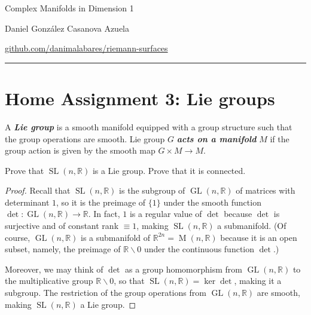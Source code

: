 \documentclass{article}
\numberwithin{equation}{section}
\newcommand{\R}{\mathbb{R}}
\DeclareMathOperator{\GL}{GL}
\DeclareMathOperator{\SL}{SL}
\DeclareMathOperator{\M}{M}
\begin{document}
\begin{minipage}{\textwidth}
	\begin{minipage}{.5\textwidth}
		Complex Manifolds in Dimension 1
	\end{minipage}%
	\begin{minipage}{.5\textwidth}
		\raggedleft
		Daniel González Casanova Azuela\par
		{\small\href{https://github.com/danimalabares/riemann-surfaces}{github.com/danimalabares/riemann-surfaces}}
	\end{minipage}%
\end{minipage}\vspace{.2cm}\hrule
\section{Home Assignment 3: Lie groups}
\setcounter{section}{3}
\begin{defn}
	A \textit{\textbf{Lie group}} is a smooth manifold equipped with a group structure such that the group operations are smooth. Lie group $G$ \textbf{\textit{acts on a manifold}} $M$ if the group action is given by the smooth map $G \times M \to M$.
\end{defn}
\begin{exercise}
	Prove that $\SL(n,\R)$ is a Lie group. Prove that it is connected.
\end{exercise}
\begin{proof}
	Recall that $\SL(n,\R)$ is the subgroup of $\GL(n,\R)$ of matrices with determinant $1$, so it is the preimage of $\{1\}$ under the smooth function $\det:\GL(n,\R)\to\R$. In fact, $1$ is a regular value of $\det$ because $\det$ is surjective and of constant rank $\equiv1$, making $\SL(n,\R)$ a submanifold. (Of course, $\GL(n,\R)$ is a submanifold of $\R^{2n}=\M(n,\R)$ because it is an open subset, namely, the preimage of $\R\backslash0$ under the continuous function $\det$.)
	
	Moreover, we may think of $\det$ as a group homomorphism from $\GL(n,\R)$ to the multiplicative group $\R\backslash0$, so that $\SL(n,\R)=\ker\det$, making it a subgroup. The restriction of the group operations from $\GL(n,\R)$ are smooth, making $\SL(n,\R)$ a Lie group.
\end{proof}
\end{document}
